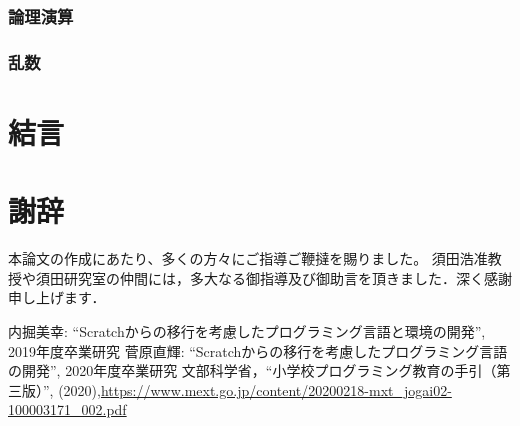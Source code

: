 \documentclass[10pt,a4j]{ltjsarticle}
\begin{document}
\subsubsection{論理演算}
\subsubsection{乱数}

\section{結言}

\clearpage

\section{謝辞}
本論文の作成にあたり、多くの方々にご指導ご鞭撻を賜りました。
須田浩准教授や須田研究室の仲間には，多大なる御指導及び御助言を頂きました．深く感謝申し上げます．
\clearpage

\begin{thebibliography}{99}
 内掘美幸: ``Scratchからの移行を考慮したプログラミング言語と環境の開発'', 2019年度卒業研究
 菅原直輝: ``Scratchからの移行を考慮したプログラミング言語の開発'', 2020年度卒業研究
 文部科学省，``小学校プログラミング教育の手引（第三版）'', (2020),\url{https://www.mext.go.jp/content/20200218-mxt_jogai02-100003171_002.pdf}
\end{thebibliography}
\end{document}
